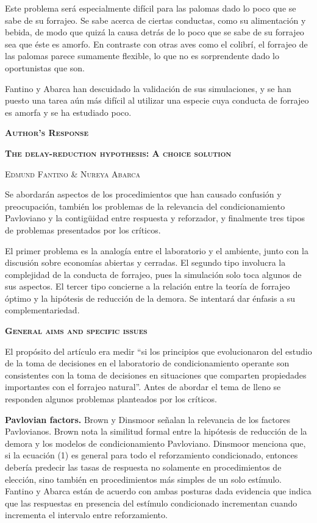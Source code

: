 \documentclass[a4paper,12pt]{article}
\begin{document}
Este problema será especialmente difícil para las palomas dado lo poco que se sabe de su forrajeo. Se sabe acerca de ciertas conductas, como su alimentación y bebida, de modo que quizá la causa detrás de lo poco que se sabe de su forrajeo sea que éste es amorfo. En contraste con otras aves como el colibrí, el forrajeo de las palomas parece sumamente flexible, lo que no es sorprendente dado lo oportunistas que son.

Fantino y Abarca han descuidado la validación de sus simulaciones, y se han puesto una tarea aún más difícil al utilizar una especie cuya conducta de forrajeo es amorfa y se ha estudiado poco.

\newpage

{\Large\scshape\bfseries Author's Response}

{\scshape\bfseries The delay-reduction hypothesis: A choice solution}

{\scshape Edmund Fantino \& Nureya Abarca}

Se abordarán aspectos de los procedimientos que han causado confusión y preocupación, también los problemas de la relevancia del condicionamiento Pavloviano y la contigüidad entre respuesta y reforzador, y finalmente tres tipos de problemas presentados por los críticos.

El primer problema es la analogía entre el laboratorio y el ambiente, junto con la discusión sobre economías abiertas y cerradas. El segundo tipo involucra la complejidad de la conducta de forrajeo, pues la simulación solo toca algunos de sus aspectos. El tercer tipo concierne a la relación entre la teoría de forrajeo óptimo y la hipótesis de reducción de la demora. Se intentará dar énfasis a su complementariedad.

{\scshape\bfseries General aims and specific issues}

El propósito del artículo era medir ``si los principios que evolucionaron del estudio de la toma de decisiones en el laboratorio de condicionamiento operante son consistentes con la toma de decisiones en situaciones que comparten propiedades importantes con el forrajeo natural''. Antes de abordar el tema de lleno se responden algunos problemas planteados por los críticos.

{\bfseries Pavlovian factors.} Brown y Dinsmoor señalan la relevancia de los factores Pavlovianos. Brown nota la similitud formal entre la hipótesis de reducción de la demora y los modelos de condicionamiento Pavloviano. Dinsmoor menciona que, si la ecuación (1) es general para todo el reforzamiento condicionado, entonces debería predecir las tasas de respuesta no solamente en procedimientos de elección, sino también en procedimientos más simples de un solo estímulo. Fantino y Abarca están de acuerdo con ambas posturas dada evidencia que indica que las respuestas en presencia del estímulo condicionado incrementan cuando incrementa el intervalo entre reforzamiento. 
\end{document}

